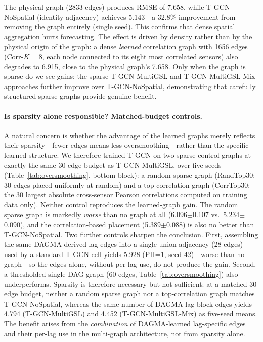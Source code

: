 The physical graph (2833 edges) produces RMSE of 7.658, while T-GCN-NoSpatial (identity adjacency) achieves 5.143---a 32.8\% improvement from removing the graph entirely (single seed). This confirms that dense spatial aggregation hurts forecasting. The effect is driven by density rather than by the physical origin of the graph: a dense \emph{learned} correlation graph with 1656 edges (Corr-$K{=}8$, each node connected to its eight most correlated sensors) also degrades to 6.915, close to the physical graph's 7.658. Only when the graph is sparse do we see gains: the sparse T-GCN-MultiGSL and T-GCN-MultiGSL-Mix approaches further improve over T-GCN-NoSpatial, demonstrating that carefully structured sparse graphs provide genuine benefit.

\paragraph{Is sparsity alone responsible? Matched-budget controls.}
A natural concern is whether the advantage of the learned graphs merely reflects their sparsity---fewer edges means less oversmoothing---rather than the specific learned structure. We therefore trained T-GCN on two sparse control graphs at exactly the same 30-edge budget as T-GCN-MultiGSL, over five seeds (Table~\ref{tab:oversmoothing}, bottom block): a random sparse graph (RandTop30; 30 edges placed uniformly at random) and a top-correlation graph (CorrTop30; the 30 largest absolute cross-sensor Pearson correlations computed on training data only). Neither control reproduces the learned-graph gain. The random sparse graph is markedly \emph{worse} than no graph at all (6.096$\pm$0.107 vs.\ 5.234$\pm$0.090), and the correlation-based placement (5.389$\pm$0.088) is also no better than T-GCN-NoSpatial. Two further controls sharpen the conclusion. First, assembling the same DAGMA-derived lag edges into a single union adjacency (28 edges) used by a standard T-GCN cell yields 5.928 (PH=1, seed 42)---worse than no graph---so the edges alone, without per-lag use, do not produce the gain. Second, a thresholded single-DAG graph (60 edges, Table~\ref{tab:oversmoothing}) also underperforms. Sparsity is therefore necessary but not sufficient: at a matched 30-edge budget, neither a random sparse graph nor a top-correlation graph matches T-GCN-NoSpatial, whereas the same number of DAGMA lag-block edges yields 4.794 (T-GCN-MultiGSL) and 4.452 (T-GCN-MultiGSL-Mix) as five-seed means. The benefit arises from the \emph{combination} of DAGMA-learned lag-specific edges and their per-lag use in the multi-graph architecture, not from sparsity alone.

